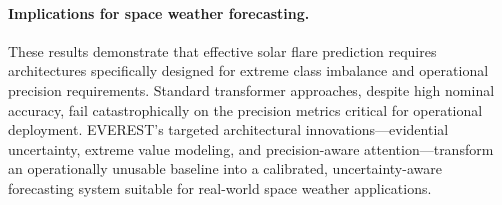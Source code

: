 \paragraph{Implications for space weather forecasting.}
These results demonstrate that effective solar flare prediction requires architectures specifically designed for extreme class imbalance and operational precision requirements. Standard transformer approaches, despite high nominal accuracy, fail catastrophically on the precision metrics critical for operational deployment. \textsc{EVEREST}'s targeted architectural innovations—evidential uncertainty, extreme value modeling, and precision-aware attention—transform an operationally unusable baseline into a calibrated, uncertainty-aware forecasting system suitable for real-world space weather applications. 
